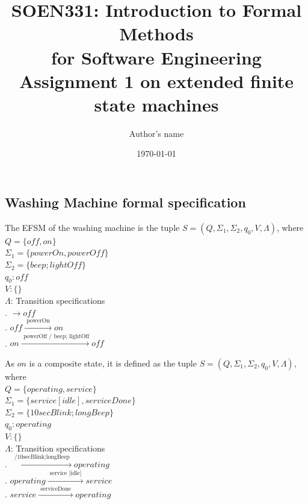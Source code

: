 \documentclass[12pt]{article}
\title{SOEN331: Introduction to Formal Methods\\for Software Engineering\\
Assignment 1 on extended finite state machines}
\author{Author's name}
\date{\today}
\begin{document}
\begin{spacing}{1.5}

\maketitle

\section{Washing Machine formal specification}

\noindent The EFSM of the washing machine is the tuple $S = (Q, \Sigma_1, \Sigma_2, q_0, V, \Lambda)$, where\\

\noindent $Q = \{off, on\}$\\
\noindent $\Sigma_1 = \{powerOn, powerOff\}$\\
\noindent $\Sigma_2 = \{beep;lightOff\}$\\
\noindent $q_0: off$\\
\noindent $V: \{\}$\\
\noindent $\Lambda$: Transition specifications\\
. $\rightarrow off$\\
. $off \xrightarrow {\text { powerOn }} on$\\
. $on \xrightarrow {\text { powerOff / beep; lightOff}} off$\\
\newpage

\noindent As $on$ is a composite state, it is defined as the tuple $S = (Q, \Sigma_1, \Sigma_2, q_0, V, \Lambda)$, where\\

\noindent $Q = \{operating, service\}$\\
\noindent $\Sigma_1 = \{service [idle], serviceDone\}$\\
\noindent $\Sigma_2 = \{10secBlink;longBeep\}$\\
\noindent $q_0: operating$\\
\noindent $V: \{\}$\\
\noindent $\Lambda$: Transition specifications\\
. $\xrightarrow {\text { /10secBlink;longBeep }} operating$\\
. $operating \xrightarrow {\text { service [idle] }} service$\\
. $service \xrightarrow {\text { serviceDone }} operating$\\


\end{spacing}
\end{document}
